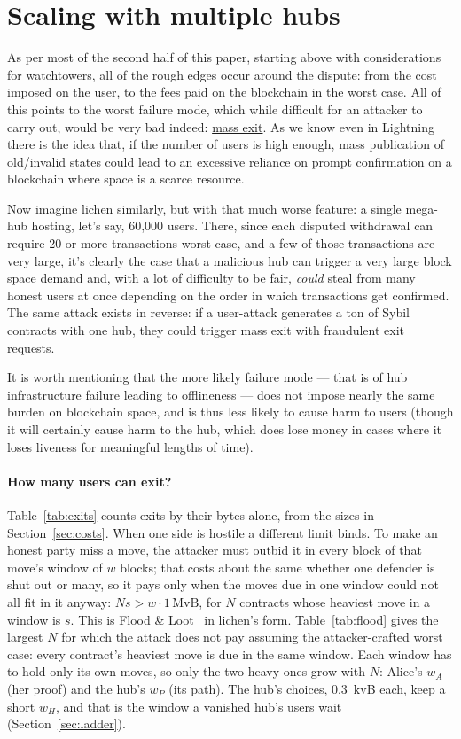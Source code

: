 \documentclass[11pt]{article}
\begin{document}
\section{Scaling with multiple hubs}
\label{sec:multihub}

As per most of the second half of this paper, starting above with considerations for watchtowers, all of the rough edges occur around the dispute: from the cost imposed on the user, to the fees paid on the blockchain in the worst case. All of this points to the worst failure mode, which while difficult for an attacker to carry out, would be very bad indeed: \underline{mass exit}. As we know even in Lightning there is the idea that, if the number of users is high enough, mass publication of old/invalid states could lead to an excessive reliance on prompt confirmation on a blockchain where space is a scarce resource.

Now imagine lichen similarly, but with that much worse feature: a single mega-hub hosting, let's say, 60,000 users. There, since each disputed withdrawal can require 20 or more transactions worst-case, and a few of those transactions are very large, it's clearly the case that a malicious hub can trigger a very large block space demand and, with a lot of difficulty to be fair, \emph{could} steal from many honest users at once depending on the order in which transactions get confirmed. The same attack exists in reverse: if a user-attack generates a ton of Sybil contracts with one hub, they could trigger mass exit with fraudulent exit requests.

It is worth mentioning that the more likely failure mode --- that is of hub infrastructure failure leading to offlineness --- does not impose nearly the same burden on blockchain space, and is thus less likely to cause harm to users (though it will certainly cause harm to the hub, which does lose money in cases where it loses liveness for meaningful lengths of time).

\paragraph{How many users can exit?} Table~\ref{tab:exits} counts exits
by their bytes alone, from the sizes in Section~\ref{sec:costs}. When one
side is hostile a different limit binds. To make an honest party miss a
move, the attacker must outbid it in every block of that move's window
of $w$ blocks; that costs about the same whether one defender is shut out
or many, so it pays only when the moves due in one window could not all
fit in it anyway: $N s > w \cdot 1\,\mathrm{MvB}$, for $N$ contracts
whose heaviest move in a window is $s$. This is Flood \&
Loot~\cite{floodloot} in lichen's form. Table~\ref{tab:flood} gives the
largest $N$ for which the attack does not pay assuming the attacker-crafted worst case: every contract's heaviest move is due in the same window.
Each window has to hold only its own moves, so only the two heavy ones
grow with $N$: Alice's $w_A$ (her proof) and the hub's $w_P$ (its path).
The hub's choices, 0.3~kvB each, keep a short $w_H$, and that is the
window a vanished hub's users wait (Section~\ref{sec:ladder}).
\end{document}
